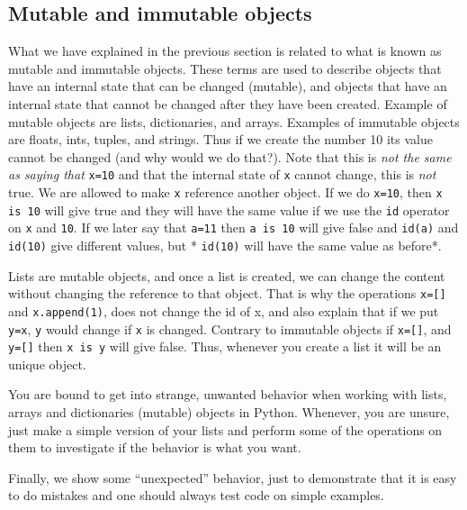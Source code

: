 \documentclass[graybox,sectrefs,envcountresetchap,open=right,final]{svmonodo}
\newenvironment{graybox2admon}[1][]{
\begin{graybox2mdframed}[frametitle=#1]
}
{
\end{graybox2mdframed}
}
\begin{document}
\subsection{Mutable and immutable objects}
What we have explained in the previous section is related to what is known as mutable and immutable objects. These terms are used to describe objects that have an internal state that can be changed (mutable), and objects that have an internal state that cannot be changed after they have been created. Example of mutable objects are lists, dictionaries, and arrays. Examples of immutable objects are floats, ints, tuples, and strings. Thus if we create the number 10 its value cannot be changed (and why would we do that?). Note that this is \emph{not the same as saying that}  \texttt{x=10} and that the internal state of \texttt{x} cannot change, this is \emph{not} true. We are allowed to make \texttt{x} reference another object. If we do \texttt{x=10}, then \texttt{x is 10} will give true and they will have the same value if we use the \texttt{id} operator on \texttt{x} and \texttt{10}. If we later say that \texttt{a=11} then \texttt{a is 10} will give false and \texttt{id(a)} and \texttt{id(10)} give different values, but * \texttt{id(10)} will have the same value as before*.

Lists are mutable objects, and once a list is created, we can change the content without changing the reference to that object. That is why the operations \texttt{x=[]} and \texttt{x.append(1)}, does not change the id of x, and also explain that if we put \texttt{y=x}, \texttt{y} would change if \texttt{x} is changed. Contrary to immutable objects if \texttt{x=[]}, and \texttt{y=[]} then \texttt{x is y} will give false. Thus, whenever you create a list it will be an unique object.    



\begin{graybox2admon}[A final tip]
You are bound to get into strange, unwanted behavior when working with lists, arrays and dictionaries (mutable) objects in Python. Whenever, you are unsure, just make a simple version of your lists and perform some of the operations on them to investigate if the behavior is what you want.
\end{graybox2admon}



Finally, we show some ``unexpected'' behavior, just to demonstrate that it is easy to do mistakes and one should always test code on simple examples. 
\end{document}
